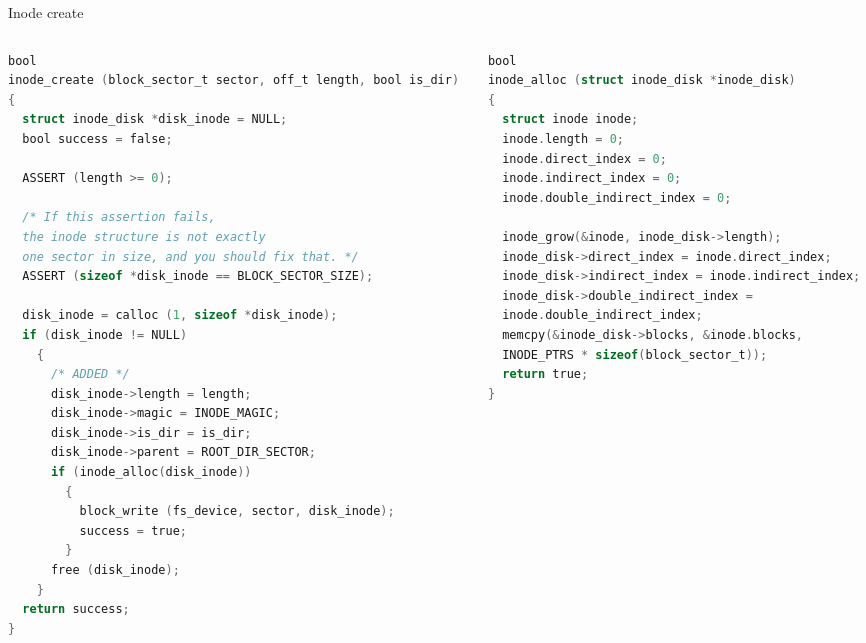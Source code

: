 \documentclass[10pt]{beamer}
\begin{document}
\begin{frame}[fragile]{Inode create}
\begin{columns}
\begin{column}{0.5\textwidth}
\begin{lstlisting}[language=C]
bool
inode_create (block_sector_t sector, off_t length, bool is_dir)
{
  struct inode_disk *disk_inode = NULL;
  bool success = false;

  ASSERT (length >= 0);

  /* If this assertion fails, 
  the inode structure is not exactly
  one sector in size, and you should fix that. */
  ASSERT (sizeof *disk_inode == BLOCK_SECTOR_SIZE);

  disk_inode = calloc (1, sizeof *disk_inode);
  if (disk_inode != NULL)
    {
      /* ADDED */
      disk_inode->length = length;
      disk_inode->magic = INODE_MAGIC;
      disk_inode->is_dir = is_dir;
      disk_inode->parent = ROOT_DIR_SECTOR;
      if (inode_alloc(disk_inode)) 
        {
          block_write (fs_device, sector, disk_inode);
          success = true; 
        } 
      free (disk_inode);
    }
  return success;
}
\end{lstlisting}
\end{column}
\begin{column}{0.5\textwidth}
\begin{lstlisting}[language=C]
bool
inode_alloc (struct inode_disk *inode_disk)
{
  struct inode inode;
  inode.length = 0;
  inode.direct_index = 0;
  inode.indirect_index = 0;
  inode.double_indirect_index = 0;

  inode_grow(&inode, inode_disk->length);
  inode_disk->direct_index = inode.direct_index;
  inode_disk->indirect_index = inode.indirect_index;
  inode_disk->double_indirect_index = 
  inode.double_indirect_index;
  memcpy(&inode_disk->blocks, &inode.blocks,
  INODE_PTRS * sizeof(block_sector_t));
  return true;
}
\end{lstlisting}
\end{column}
\end{columns}
\end{frame}
\end{document}
